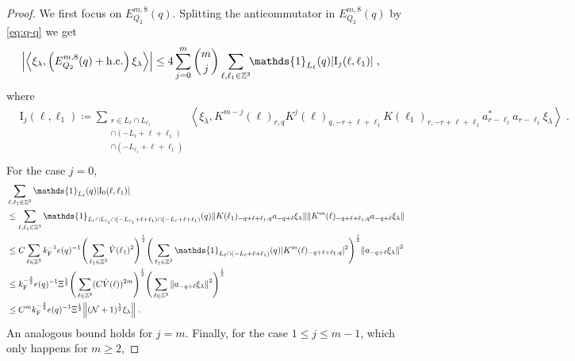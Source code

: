 \documentclass[12pt,a4paper]{article}
\numberwithin{equation}{section}
\newcommand{\1}{\mathbb{I}}
\newcommand{\F}{\mathrm{F}}
\newcommand{\I}{\mathrm{I}}
\newcommand{\kF}{k_\F}
\newcommand{\Zstar}{\mathbb{Z}^3} %
\newcommand{\Z}{\mathbb{Z}}
\newcommand{\NN}{\mathcal{N}}
\newcommand{\half}{\frac{1}{2}}
\newcommand{\eva}[1]{\left\langle #1 \right\rangle}
\theoremstyle{plain}
\theoremstyle{definition}
\theoremstyle{remark}
\theoremstyle{plain}
\theoremstyle{definition}
\theoremstyle{remark}
\begin{document}
\begin{proof}
We first focus on $ E^{m,8}_{Q_2}(q) $.
Splitting the anticommutator in $ E^{m,8}_{Q_2}(q) $ by \eqref{eq:q-q} we get
\begin{equation} \label{eq:EQ2181}
\begin{aligned}
	& \abs{\eva{\xi_\lambda,\left(E^{m,8}_{Q_2}(q) + \mathrm{h.c.}\right) \xi_\lambda }}
	\le 4 \sum_{j=0}^m {{m}\choose j} \sum_{\ell,\ell_1 \in \Zstar}\!\! \mathds{1}_{L_\ell}(q) |\I_j(\ell, \ell_1)| \;,
	\end{aligned}
\end{equation}
where
\begin{equation}
\begin{aligned}
	& \I_j(\ell, \ell_1)
	\coloneq \sum_{\substack{r\in L_{\ell} \cap L_{\ell_1}\\\cap (-L_{\ell}+\ell+\ell_1) \\ \cap (-L_{\ell_1}+\ell+\ell_1)}}
		\eva{\xi_\lambda, K^{m-j}(\ell)_{r,q} K^{j}(\ell)_{q,-r+\ell+\ell_1} K(\ell_1)_{r,-r+\ell+\ell_1} a^*_{r-\ell_1} a_{r-\ell_1} \xi_\lambda} \;. \\
\end{aligned}
\end{equation}
For the case $ j = 0 $,
\begin{align}
	&\sum_{\ell,\ell_1 \in \Zstar} \mathds{1}_{L_\ell}(q) |\I_0(\ell, \ell_1)| \nonumber\\
	&\leq \sum_{\ell,\ell_1 \in \Zstar} \mathds{1}_{L_\ell \cap L_{\ell_1} \cap (-L_{\ell_1} + \ell + \ell_1) \cap (-L_\ell + \ell + \ell_1)}(q)
		\norm{ K(\ell_1)_{-q+\ell+\ell_1,q} a_{-q+\ell} \xi_\lambda}
		\norm{ K^m(\ell)_{-q+\ell+\ell_1,q} a_{-q+\ell} \xi_\lambda } \nonumber\\
	&\leq C \sum_{\ell \in \Zstar} \kF^{-1} e(q)^{-1}
		\Bigg( \sum_{\ell_1 \in \Zstar} \hat{V}(\ell_1)^2 \Bigg)^{\half}
	\Bigg( \sum_{\ell_1 \in \Zstar} \mathds{1}_{L_\ell \cap (-L_\ell + \ell + \ell_1)}(q) |K^m(\ell)_{-q+\ell+\ell_1,q}|^2 \Bigg)^{\half}
		\norm{ a_{-q+\ell} \xi_\lambda }^2 \nonumber\\
	&\leq \kF^{-\frac 32} e(q)^{-1} \Xi^\half
		\Bigg( \sum_{\ell \in \Zstar} (C \hat{V}(\ell))^{2m} \Bigg)^{\half}
		\Bigg( \sum_{\ell \in \Z^3} \norm{a_{-q+\ell} \xi_\lambda }^2 \Bigg)^{\half} \nonumber\\
	&\leq C^m \kF^{-\frac 32} e(q)^{-1} \Xi^{\half} \norm{(\NN+1)^{\half} \xi_\lambda} \;. \label{eq:estEQ2181}
\end{align}
An analogous bound holds for $ j = m $. Finally, for the case $ 1 \le j \le m-1 $, which only happens for $ m \ge 2 $,

\end{proof}
\end{document}
